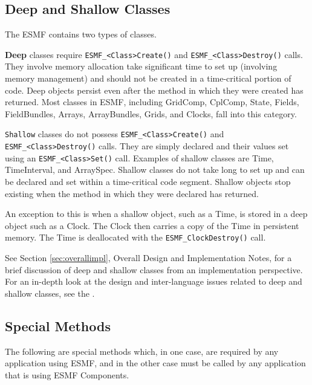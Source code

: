 \subsection{Deep and Shallow Classes}
\label{sec:deepshallow}

The ESMF contains two types of classes.

{\bf Deep} classes require
{\tt ESMF\_<Class>Create()} and {\tt ESMF\_<Class>Destroy()} calls.
They involve memory allocation take significant time to set up (involving
memory management) and should not be created in a time-critical portion of code.
Deep objects persist even after the method in which they were created has
returned. Most classes in ESMF, including GridComp, CplComp, State, Fields, FieldBundles, Arrays, ArrayBundles, Grids, and Clocks, fall into this category.

{\tt Shallow} classes do not possess {\tt ESMF\_<Class>Create()}
and {\tt ESMF\_<Class>Destroy()} calls.  They are simply declared
and their values set using an {\tt ESMF\_<Class>Set()} call.  
Examples of shallow classes are Time, TimeInterval, and ArraySpec.  Shallow classes do not take long to set up and can be declared and set within
a time-critical code segment.  Shallow objects stop existing when
the method in which they were declared has returned.  

An exception to this is when a shallow object, such as a Time, 
is stored in a deep object such as a Clock.  The Clock then
carries a copy of the Time in persistent memory.  The Time is
deallocated with the {\tt ESMF\_ClockDestroy()} call.

See Section \ref{sec:overallimpl}, Overall Design and Implementation 
Notes, for a brief discussion of deep and shallow classes from 
an implementation perspective.  For an in-depth look at the design 
and inter-language issues related to deep and shallow classes,
see the .

\subsection{Special Methods}

The following are special methods which, in one case,
are required by any application using ESMF, and in the 
other case must be called by any application that is using 
ESMF Components.

